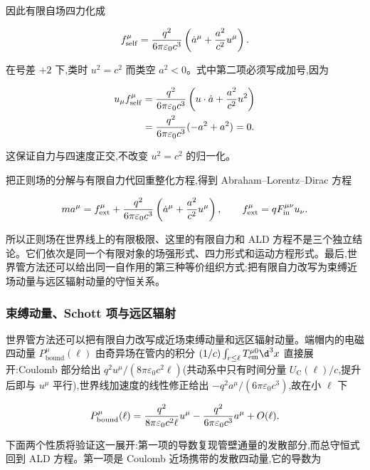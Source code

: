因此有限自场四力化成

\begin{equation*}
 f_{\mathrm{self}}^\mu
 ={q^2\over6\pi\varepsilon_0c^3}
 \left(
 \dot a^\mu+{a^2\over c^2}u^\mu
 \right).
\end{equation*}

在号差 $+2$ 下,类时 $u^2=c^2$ 而类空 $a^2<0$。式中第二项必须写成加号,因为

\begin{align*}
 u_\mu f_{\mathrm{self}}^\mu
 &={q^2\over6\pi\varepsilon_0c^3}
 \left(u\cdot\dot a+{a^2\over c^2}u^2\right)\\
 &={q^2\over6\pi\varepsilon_0c^3}(-a^2+a^2)=0.
\end{align*}

这保证自力与四速度正交,不改变 $u^2=c^2$ 的归一化。

把正则场的分解与有限自力代回重整化方程,得到 Abraham--Lorentz--Dirac 方程

\begin{equation*}
 ma^\mu
 =f_{\mathrm{ext}}^\mu
 +{q^2\over6\pi\varepsilon_0c^3}
 \left(
 \dot a^\mu+{a^2\over c^2}u^\mu
 \right),
 \qquad
 f_{\mathrm{ext}}^\mu=qF_{\mathrm{in}}^{\mu\nu}u_\nu.
\end{equation*}

所以正则场在世界线上的有限极限、这里的有限自力和 ALD 方程不是三个独立结论。它们依次是同一个有限对象的场强形式、四力形式和运动方程形式。最后,世界管方法还可以给出同一自作用的第三种等价组织方式:把有限自力改写为束缚近场动量与远区辐射动量的守恒关系。

\subsubsection{束缚动量、Schott 项与远区辐射}

世界管方法还可以把有限自力改写成近场束缚动量和远区辐射动量。端帽内的电磁四动量 $P_{\mathrm{bound}}^\mu(\ell)$ 由奇异场在管内的积分 $(1/c)\int_{r\le\ell}T_{\mathrm{em}}^{\mu0}\d^3x$ 直接展开:Coulomb 部分给出 $q^2u^\mu/(8\pi\varepsilon_0c^2\ell)$(共动系中只有时间分量 $U_{\mathrm C}(\ell)/c$,提升后即与 $u^\mu$ 平行),世界线加速度的线性修正给出 $-q^2a^\mu/(6\pi\varepsilon_0c^3)$,故在小 $\ell$ 下

\begin{equation*}
 P_{\mathrm{bound}}^\mu(\ell)
 ={q^2\over8\pi\varepsilon_0c^2\ell}u^\mu
 -{q^2\over6\pi\varepsilon_0c^3}a^\mu
 +O(\ell).
\end{equation*}

下面两个性质将验证这一展开:第一项的导数复现管壁通量的发散部分,而总守恒式回到 ALD 方程。第一项是 Coulomb 近场携带的发散四动量,它的导数为

